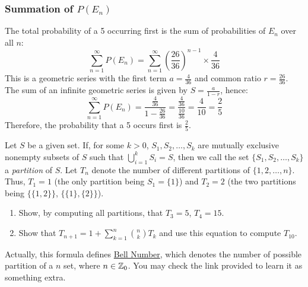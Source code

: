 \begin{solution}
            \subsubsection*{Summation of \( P(E_n) \)}
            The total probability of a 5 occurring first is the sum of probabilities of \( E_n \) over all \( n \):
            \[
            \sum_{n=1}^{\infty} P(E_n) = \sum_{n=1}^{\infty} \left(\frac{26}{36}\right)^{n-1} \times \frac{4}{36}
            \]
            This is a geometric series with the first term \( a = \frac{4}{36} \) and common ratio \( r = \frac{26}{36} \). The sum of an infinite geometric series is given by \( S = \frac{a}{1 - r} \), hence:
            \[
            \sum_{n=1}^{\infty} P(E_n) = \frac{\frac{4}{36}}{1 - \frac{26}{36}} = \frac{\frac{4}{36}}{\frac{10}{36}} = \frac{4}{10} = \frac{2}{5}
            \]
            Therefore, the probability that a 5 occurs first is \( \frac{2}{5} \).
        \end{solution}

        \begin{exercise}
            Let \( S \) be a given set. If, for some \( k > 0 \), \( S_1, S_2, \ldots, S_k \) are mutually exclusive nonempty subsets of \( S \) such that \(\bigcup_{i=1}^k S_i = S\), then we call the set \( \{S_1, S_2, \ldots, S_k\} \) a \textit{partition} of \( S \). Let \( T_n \) denote the number of different partitions of \( \{1, 2, \ldots, n\} \). Thus, \( T_1 = 1 \) (the only partition being \( S_1 = \{1\} \)) and \( T_2 = 2 \) (the two partitions being \( \{\{1, 2\}\} \), \( \{\{1\}, \{2\}\} \)).
            
            \begin{enumerate}[label=(\alph*)]
                \item Show, by computing all partitions, that \( T_3 = 5 \), \( T_4 = 15 \).
                \item Show that \( T_{n+1} = 1 + \sum_{k=1}^n \binom{n}{k} T_k \) and use this equation to compute \( T_{10} \).
            \end{enumerate}
            \begin{remark}
                Actually, this formula defines \href{https://www.wikiwand.com/en/Bell_number}{Bell Number}, which denotes the number of possible partition of a $n$ set, where $n\in \mathbb{Z}_0$. You may
                check the link provided to learn it as something extra.
            \end{remark}
        \end{exercise}

